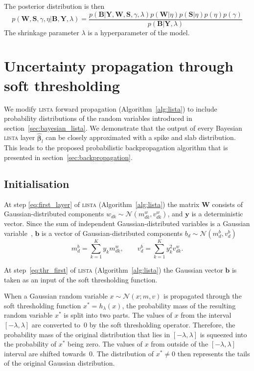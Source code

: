 \documentclass{article}
\begin{document}
The posterior distribution is then
\begin{equation}
\label{eq:posterior}
p(\mathbf{W}, \mathbf{S}, \gamma, \eta | \mathbf{B}, \mathbf{Y}, \lambda) = \frac{p(\mathbf{B} | \mathbf{Y}, \mathbf{W},  \mathbf{S}, \gamma, \lambda) p(\mathbf{W} | \eta )p(\mathbf{S} | \eta) p(\eta) p(\gamma)}{p(\mathbf{B} | \mathbf{Y}, \lambda)}
\end{equation}
The shrinkage parameter $\lambda$ is a hyperparameter of the model.

\section{Uncertainty propagation through soft thresholding}
\label{sec:fprop}
We modify \textsc{lista} forward propagation (Algorithm~\ref{alg:lista}) to include probability distributions of the random variables introduced in section~\ref{sec:bayesian_lista}.
We demonstrate that the output of every Bayesian \textsc{lista} layer $\widehat{\boldsymbol\beta}_l$ can be closely approximated with a spike and slab distribution. This leads to the proposed probabilistic backpropagation algorithm that is presented in section~\ref{sec:backpropagation}.

\subsection{Initialisation}
At step \ref{eq:first_layer} of \textsc{lista} (Algorithm~\ref{alg:lista}) the matrix $\mathbf{W}$ consists of Gaussian-distributed components $w_{dk} \sim \mathcal{N}(m^w_{dk}, v^w_{dk})$, and $\mathbf{y}$ is a deterministic vector. Since the sum of independent Gaussian-distributed variables is a Gaussian variable~\cite{eisenberg2008sum}, $\mathbf{b}$ is a vector of Gaussian-distributed components $b_d \sim \mathcal{N}(m^b_d, v^b_d)$
\begin{equation}
\label{eq:matrix_vector_product}
m^b_d = \sum_{k=1}^Ky_k m^w_{dk}, \qquad
v^b_d = \sum_{k=1}^Ky_k^2v^w_{dk}.
\end{equation}

At step~\ref{eq:thr_first} of \textsc{lista} (Algorithm~\ref{alg:lista}) the Gaussian vector $\mathbf{b}$ is taken as an input of the soft thresholding function.

When a Gaussian random variable $x \sim \mathcal{N}(x; m, v)$ is propagated through the soft thresholding function $x^* = h_{\lambda}(x)$, the probability mass of the resulting random variable $x^*$ is split into two parts. The values of $x$ from the interval $[-\lambda, \lambda]$ are converted to~$0$ by the soft thresholding operator. Therefore, the probability mass of the original distribution that lies in $[-\lambda, \lambda]$ is squeezed into the probability of $x^*$ being zero. The values of $x$ from outside of the $[-\lambda, \lambda]$ interval are shifted towards~$0$. The distribution of $x^* \neq 0$ then represents the tails of the original Gaussian distribution.
\end{document}
